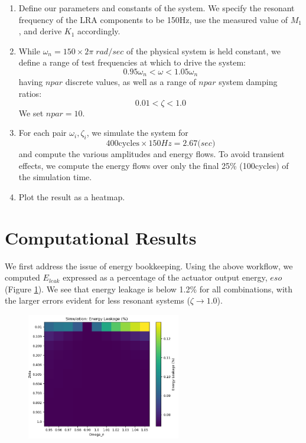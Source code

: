 \documentclass[letterpaper,11pt]{article}
\begin{document}
\begin{enumerate}
    \item Define our parameters and constants of the system. We specify the resonant
    frequency of the LRA components to be 150Hz, use the measured value of
    $M_1$, and derive $K_1$ accordingly.

    \item While $\omega_n = 150\times2\pi\;rad/sec$ of the physical system
    is held constant, we define a range of test
    frequencies at which to drive the system:
        \[
            0.95 \omega_n < \omega < 1.05 \omega_n
            \]
        having $npar$ discrete values, as well as a range of $npar$ system damping ratios:
            \[
                0.01 < \zeta < 1.0
                \]
    We set $npar=10$.

    \item For each pair $\omega_i, \zeta_i$, we simulate the system for
    \[
    400 \mathrm{cycles}\times 150 Hz = 2.67 \mathrm(sec)
    \]
    and compute the various  amplitudes and energy flows.
    To avoid transient effects, we compute the energy flows over only the final
    25\% (100cycles)
    of the simulation time.

    \item Plot the result as a heatmap.

\end{enumerate}



\section{Computational Results}

We first address the issue of energy bookkeeping.  Using the above workflow, we
 computed $E_{leak}$ expressed as a percentage of the actuator output energy,
$eso$ (Figure \ref{EleakFig}).   We see that energy leakage is below 1.2\%
for all combinations, with the larger errors evident for less resonant
systems ($\zeta \to 1.0$).


\begin{figure}
\includegraphics[width=0.6\textwidth]{heatmapleakage_11x11.png}
\caption{}\label{EleakFig}
\end{figure}
\end{document}
